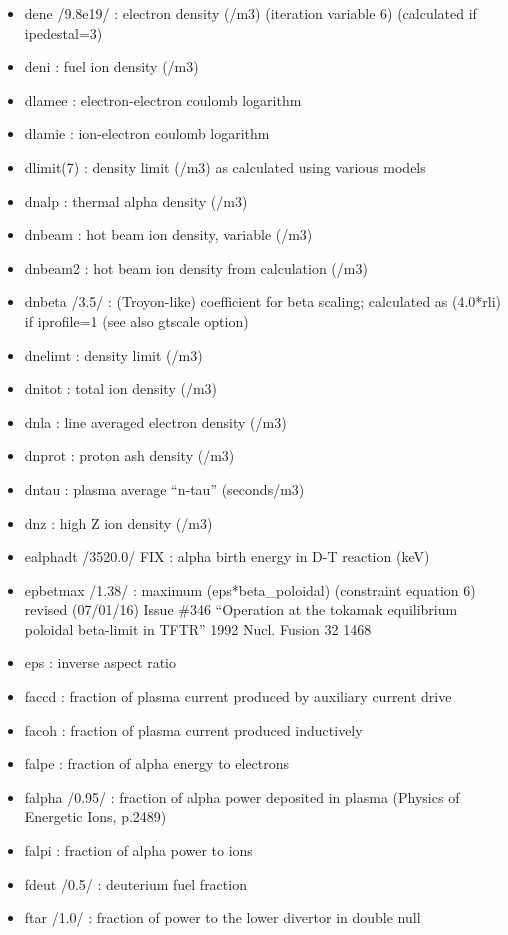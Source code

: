 \documentclass[]{article}
\begin{document}
\begin{itemize}
\item
  dene /9.8e19/ : electron density (/m3) (iteration variable 6)
  (calculated if ipedestal=3)
\item
  deni : fuel ion density (/m3)
\item
  dlamee : electron-electron coulomb logarithm
\item
  dlamie : ion-electron coulomb logarithm
\item
  dlimit(7) : density limit (/m3) as calculated using various models
\item
  dnalp : thermal alpha density (/m3)
\item
  dnbeam : hot beam ion density, variable (/m3)
\item
  dnbeam2 : hot beam ion density from calculation (/m3)
\item
  dnbeta /3.5/ : (Troyon-like) coefficient for beta scaling; calculated
  as (4.0*rli) if iprofile=1 (see also gtscale option)
\item
  dnelimt : density limit (/m3)
\item
  dnitot : total ion density (/m3)
\item
  dnla : line averaged electron density (/m3)
\item
  dnprot : proton ash density (/m3)
\item
  dntau : plasma average ``n-tau'' (seconds/m3)
\item
  dnz : high Z ion density (/m3)
\item
  ealphadt /3520.0/ FIX : alpha birth energy in D-T reaction (keV)
\item
  epbetmax /1.38/ : maximum (eps*beta\_poloidal) (constraint equation 6)
  revised (07/01/16) Issue \#346 ``Operation at the tokamak equilibrium
  poloidal beta-limit in TFTR'' 1992 Nucl. Fusion 32 1468
\item
  eps : inverse aspect ratio
\item
  faccd : fraction of plasma current produced by auxiliary current drive
\item
  facoh : fraction of plasma current produced inductively
\item
  falpe : fraction of alpha energy to electrons
\item
  falpha /0.95/ : fraction of alpha power deposited in plasma (Physics
  of Energetic Ions, p.2489)
\item
  falpi : fraction of alpha power to ions
\item
  fdeut /0.5/ : deuterium fuel fraction
\item
  ftar /1.0/ : fraction of power to the lower divertor in double null

\end{itemize}
\end{document}
